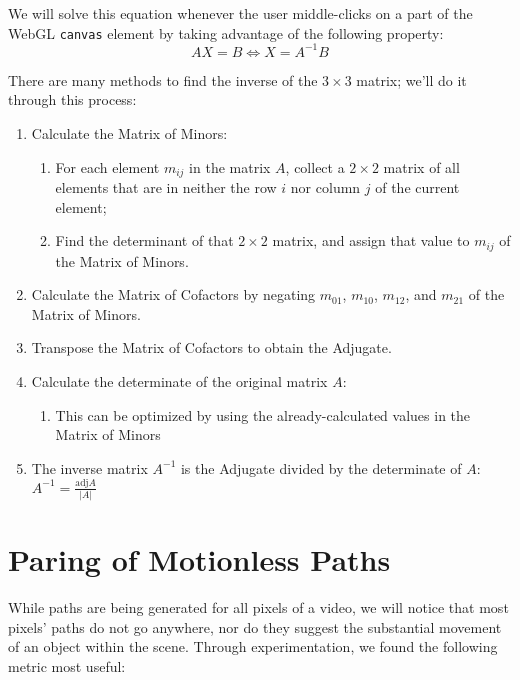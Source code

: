 \par We will solve this equation whenever the user middle-clicks on a part of the WebGL \texttt{canvas} element by taking advantage of the following property:
    \begin{equation}
    AX=B \iff X=A^{-1}B
    \end{equation}
\par There are many methods to find the inverse of the $3 \times 3$ matrix; we'll do it through this process: \cite{matlinsys}
\begin{enumerate}
    \item Calculate the Matrix of Minors:
        \begin{enumerate}
        \item For each element $m_{ij}$ in the matrix $A$, collect a $2 \times 2$ matrix of all elements that are in neither the row $i$ nor column $j$ of the current element;
        \item Find the determinant of that $2 \times 2$ matrix, and assign that value to $m_{ij}$ of the Matrix of Minors.
        \end{enumerate}
    \item Calculate the Matrix of Cofactors by negating $m_{01}$, $m_{10}$, $m_{12}$, and $m_{21}$ of the Matrix of Minors.
    \item Transpose the Matrix of Cofactors to obtain the Adjugate.
    \item Calculate the determinate of the original matrix $A$:
        \begin{enumerate}
        \item This can be optimized by using the already-calculated values in the Matrix of Minors
        \end{enumerate}
    \item The inverse matrix $A^{-1}$ is the Adjugate divided by the determinate of $A$: $A^{-1}=\frac{\text{adj}A}{|A|}$

\end{enumerate}

\section{Paring of Motionless Paths}
\label{paring}
While paths are being generated for all pixels of a video, we will notice that most pixels' paths do not go anywhere, nor do they suggest the substantial movement of an object within the scene. Through experimentation, we found the following metric most useful:

